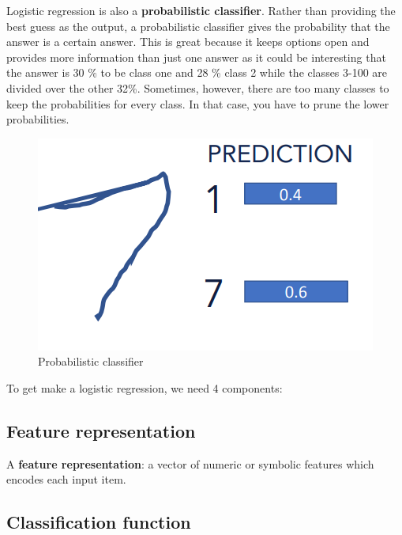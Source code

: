 \documentclass[
  11pt,
  british,
]{article}
\begin{document}
Logistic regression is also a \textbf{probabilistic classifier}. Rather
than providing the best guess as the output, a probabilistic classifier
gives the probability that the answer is a certain answer. This is great
because it keeps options open and provides more information than just
one answer as it could be interesting that the answer is 30 \% to be
class one and 28 \% class 2 while the classes 3-100 are divided over the
other 32\%. Sometimes, however, there are too many classes to keep the
probabilities for every class. In that case, you have to prune the lower
probabilities.

\begin{figure}
\centering
\includegraphics{Pasted_image_20220603190300.png}
\caption{Probabilistic classifier}
\end{figure}

To get make a logistic regression, we need 4 components:

\hypertarget{feature-representation}{%
\subsection{Feature representation}\label{feature-representation}}

A \textbf{feature representation}: a vector of numeric or symbolic
features which encodes each input item.

\hypertarget{classification-function}{%
\subsection{Classification function}\label{classification-function}}
\end{document}
